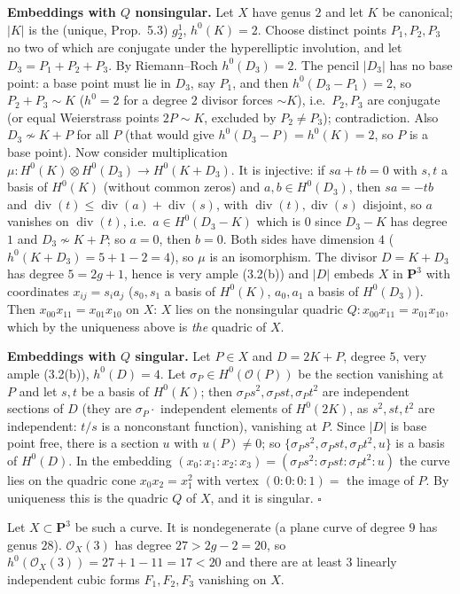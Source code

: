 \documentclass[11pt]{article}
\begin{document}
\textbf{Embeddings with $Q$ nonsingular.} Let $X$ have genus $2$ and let $K$ be canonical; $|K|$ is the (unique, Prop.~5.3) $g^1_2$, $h^0(K)=2$. Choose distinct points $P_1,P_2,P_3$ no two of which are conjugate under the hyperelliptic involution, and let $D_3=P_1+P_2+P_3$. By Riemann--Roch $h^0(D_3)=2$. The pencil $|D_3|$ has no base point: a base point must lie in $D_3$, say $P_1$, and then $h^0(D_3-P_1)=2$, so $P_2+P_3\sim K$ ($h^0=2$ for a degree $2$ divisor forces $\sim K$), i.e.\ $P_2,P_3$ are conjugate (or equal Weierstrass points $2P\sim K$, excluded by $P_2\ne P_3$); contradiction. Also $D_3\not\sim K+P$ for all $P$ (that would give $h^0(D_3-P)=h^0(K)=2$, so $P$ is a base point). Now consider multiplication $\mu:H^0(K)\otimes H^0(D_3)\to H^0(K+D_3)$. It is injective: if $sa+tb=0$ with $s,t$ a basis of $H^0(K)$ (without common zeros) and $a,b\in H^0(D_3)$, then $sa=-tb$ and $\operatorname{div}(t)\le\operatorname{div}(a)+\operatorname{div}(s)$, with $\operatorname{div}(t),\operatorname{div}(s)$ disjoint, so $a$ vanishes on $\operatorname{div}(t)$, i.e.\ $a\in H^0(D_3-K)$ which is $0$ since $D_3-K$ has degree $1$ and $D_3\not\sim K+P$; so $a=0$, then $b=0$. Both sides have dimension $4$ ($h^0(K+D_3)=5+1-2=4$), so $\mu$ is an isomorphism. The divisor $D=K+D_3$ has degree $5=2g+1$, hence is very ample (3.2(b)) and $|D|$ embeds $X$ in $\mathbf P^3$ with coordinates $x_{ij}=s_ia_j$ ($s_0,s_1$ a basis of $H^0(K)$, $a_0,a_1$ a basis of $H^0(D_3)$). Then $x_{00}x_{11}=x_{01}x_{10}$ on $X$: $X$ lies on the nonsingular quadric $Q:x_{00}x_{11}=x_{01}x_{10}$, which by the uniqueness above is \emph{the} quadric of $X$.

\textbf{Embeddings with $Q$ singular.} Let $P\in X$ and $D=2K+P$, degree $5$, very ample (3.2(b)), $h^0(D)=4$. Let $\sigma_P\in H^0(\mathcal O(P))$ be the section vanishing at $P$ and let $s,t$ be a basis of $H^0(K)$; then $\sigma_Ps^2,\sigma_Pst,\sigma_Pt^2$ are independent sections of $D$ (they are $\sigma_P\cdot$ independent elements of $H^0(2K)$, as $s^2,st,t^2$ are independent: $t/s$ is a nonconstant function), vanishing at $P$. Since $|D|$ is base point free, there is a section $u$ with $u(P)\ne0$; so $\{\sigma_Ps^2,\sigma_Pst,\sigma_Pt^2,u\}$ is a basis of $H^0(D)$. In the embedding $(x_0:x_1:x_2:x_3)=(\sigma_Ps^2:\sigma_Pst:\sigma_Pt^2:u)$ the curve lies on the quadric cone $x_0x_2=x_1^2$ with vertex $(0:0:0:1)=$ the image of $P$. By uniqueness this is the quadric $Q$ of $X$, and it is singular. \hfill$\square$

\pf
Let $X\subset\mathbf P^3$ be such a curve. It is nondegenerate (a plane curve of degree $9$ has genus $28$). $\mathcal O_X(3)$ has degree $27>2g-2=20$, so $h^0(\mathcal O_X(3))=27+1-11=17<20$ and there are at least $3$ linearly independent cubic forms $F_1,F_2,F_3$ vanishing on $X$.
\end{document}
